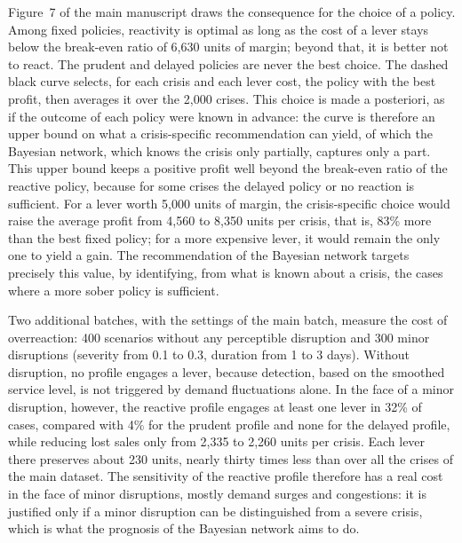 Figure~7 of the main manuscript draws the consequence for the choice of a policy. Among fixed policies, reactivity is optimal as long as the cost of a lever stays below the break-even ratio of 6,630 units of margin; beyond that, it is better not to react. The prudent and delayed policies are never the best choice. The dashed black curve selects, for each crisis and each lever cost, the policy with the best profit, then averages it over the 2,000 crises. This choice is made a posteriori, as if the outcome of each policy were known in advance: the curve is therefore an upper bound on what a crisis-specific recommendation can yield, of which the Bayesian network, which knows the crisis only partially, captures only a part. This upper bound keeps a positive profit well beyond the break-even ratio of the reactive policy, because for some crises the delayed policy or no reaction is sufficient. For a lever worth 5,000 units of margin, the crisis-specific choice would raise the average profit from 4,560 to 8,350 units per crisis, that is, 83\% more than the best fixed policy; for a more expensive lever, it would remain the only one to yield a gain. The recommendation of the Bayesian network targets precisely this value, by identifying, from what is known about a crisis, the cases where a more sober policy is sufficient.

Two additional batches, with the settings of the main batch, measure the cost of overreaction: 400 scenarios without any perceptible disruption and 300 minor disruptions (severity from 0.1 to 0.3, duration from 1 to 3 days). Without disruption, no profile engages a lever, because detection, based on the smoothed service level, is not triggered by demand fluctuations alone. In the face of a minor disruption, however, the reactive profile engages at least one lever in 32\% of cases, compared with 4\% for the prudent profile and none for the delayed profile, while reducing lost sales only from 2,335 to 2,260 units per crisis. Each lever there preserves about 230 units, nearly thirty times less than over all the crises of the main dataset. The sensitivity of the reactive profile therefore has a real cost in the face of minor disruptions, mostly demand surges and congestions: it is justified only if a minor disruption can be distinguished from a severe crisis, which is what the prognosis of the Bayesian network aims to do.
